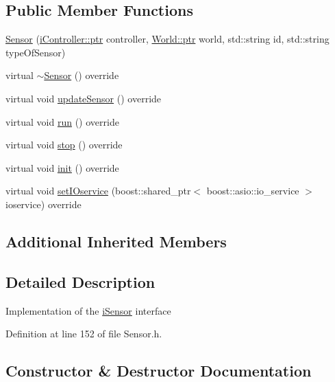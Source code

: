 \subsection*{Public Member Functions}
\begin{DoxyCompactItemize}
\item 
\hyperlink{classo_cpt_1_1_sensor_af4ccce2da93252ee71cce9874dd75a81}{Sensor} (\hyperlink{classo_cpt_1_1i_controller_a6d89a95cd6ad68bb74adfaca2f36370f}{i\+Controller\+::ptr} controller, \hyperlink{classo_cpt_1_1_world_aa6e591e3096d5de71e0cec9039663d67}{World\+::ptr} world, std\+::string id, std\+::string type\+Of\+Sensor)
\item 
virtual \hyperlink{classo_cpt_1_1_sensor_ac8bf20a2d505b88762876c09180ee97a}{$\sim$\+Sensor} () override
\item 
virtual void \hyperlink{classo_cpt_1_1_sensor_ab4b0dedb06f11bcf2368852035beb2b2}{update\+Sensor} () override
\item 
virtual void \hyperlink{classo_cpt_1_1_sensor_aef25b0e5f3a8358ee81c97c73909fbe6}{run} () override
\item 
virtual void \hyperlink{classo_cpt_1_1_sensor_a44ad78c2c091ca9cf72295293f8c5b74}{stop} () override
\item 
virtual void \hyperlink{classo_cpt_1_1_sensor_aa612a305a9a3091dd62cd1afb9d4dd7d}{init} () override
\item 
virtual void \hyperlink{classo_cpt_1_1_sensor_ae7d47e18df5eb7854bf71fbbee9568df}{set\+I\+Oservice} (boost\+::shared\+\_\+ptr$<$ boost\+::asio\+::io\+\_\+service $>$ ioservice) override
\end{DoxyCompactItemize}
\subsection*{Additional Inherited Members}


\subsection{Detailed Description}
Implementation of the \hyperlink{classo_cpt_1_1i_sensor}{i\+Sensor} interface 

Definition at line 152 of file Sensor.\+h.



\subsection{Constructor \& Destructor Documentation}
\hypertarget{classo_cpt_1_1_sensor_af4ccce2da93252ee71cce9874dd75a81}{}\label{classo_cpt_1_1_sensor_af4ccce2da93252ee71cce9874dd75a81} 
